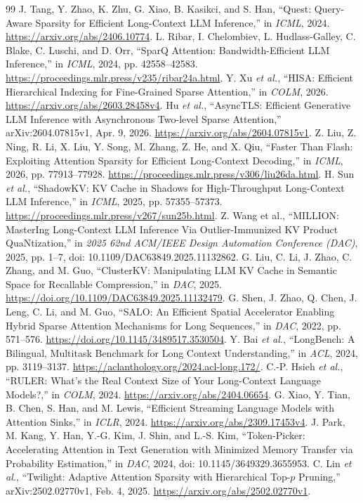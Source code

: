 \begin{thebibliography}{99}
 J. Tang, Y. Zhao, K. Zhu, G. Xiao, B. Kasikci, and S. Han, ``Quest: Query-Aware Sparsity for Efficient Long-Context LLM Inference,'' in \emph{ICML}, 2024. \url{https://arxiv.org/abs/2406.10774}.
 L. Ribar, I. Chelombiev, L. Hudlass-Galley, C. Blake, C. Luschi, and D. Orr, ``SparQ Attention: Bandwidth-Efficient LLM Inference,'' in \emph{ICML}, 2024, pp. 42558--42583. \url{https://proceedings.mlr.press/v235/ribar24a.html}.
 Y. Xu \emph{et al.}, ``HISA: Efficient Hierarchical Indexing for Fine-Grained Sparse Attention,'' in \emph{COLM}, 2026. \url{https://arxiv.org/abs/2603.28458v4}.
 Hu \emph{et al.}, ``AsyncTLS: Efficient Generative LLM Inference with Asynchronous Two-level Sparse Attention,'' arXiv:2604.07815v1, Apr. 9, 2026. \url{https://arxiv.org/abs/2604.07815v1}.
 Z. Liu, Z. Ning, R. Li, X. Liu, Y. Song, M. Zhang, Z. He, and X. Qiu, ``Faster Than Flash: Exploiting Attention Sparsity for Efficient Long-Context Decoding,'' in \emph{ICML}, 2026, pp. 77913--77928. \url{https://proceedings.mlr.press/v306/liu26da.html}.
 H. Sun \emph{et al.}, ``ShadowKV: KV Cache in Shadows for High-Throughput Long-Context LLM Inference,'' in \emph{ICML}, 2025, pp. 57355--57373. \url{https://proceedings.mlr.press/v267/sun25b.html}.
 Z. Wang et al., ``MILLION: MasterIng Long-Context LLM Inference Via Outlier-Immunized KV Product QuaNtization,'' in \emph{2025 62nd ACM/IEEE Design Automation Conference (DAC)}, 2025, pp. 1--7, doi: 10.1109/DAC63849.2025.11132862.
 G. Liu, C. Li, J. Zhao, C. Zhang, and M. Guo, ``ClusterKV: Manipulating LLM KV Cache in Semantic Space for Recallable Compression,'' in \emph{DAC}, 2025. \url{https://doi.org/10.1109/DAC63849.2025.11132479}.
 G. Shen, J. Zhao, Q. Chen, J. Leng, C. Li, and M. Guo, ``SALO: An Efficient Spatial Accelerator Enabling Hybrid Sparse Attention Mechanisms for Long Sequences,'' in \emph{DAC}, 2022, pp. 571--576. \url{https://doi.org/10.1145/3489517.3530504}.
 Y. Bai \emph{et al.}, ``LongBench: A Bilingual, Multitask Benchmark for Long Context Understanding,'' in \emph{ACL}, 2024, pp. 3119--3137. \url{https://aclanthology.org/2024.acl-long.172/}.
 C.-P. Hsieh \emph{et al.}, ``RULER: What's the Real Context Size of Your Long-Context Language Models?,'' in \emph{COLM}, 2024. \url{https://arxiv.org/abs/2404.06654}.
 G. Xiao, Y. Tian, B. Chen, S. Han, and M. Lewis, ``Efficient Streaming Language Models with Attention Sinks,'' in \emph{ICLR}, 2024. \url{https://arxiv.org/abs/2309.17453v4}.
 J. Park, M. Kang, Y. Han, Y.-G. Kim, J. Shin, and L.-S. Kim, ``Token-Picker: Accelerating Attention in Text Generation with Minimized Memory Transfer via Probability Estimation,'' in \emph{DAC}, 2024, doi: 10.1145/3649329.3655953.
 C. Lin \emph{et al.}, ``Twilight: Adaptive Attention Sparsity with Hierarchical Top-$p$ Pruning,'' arXiv:2502.02770v1, Feb. 4, 2025. \url{https://arxiv.org/abs/2502.02770v1}.
\end{thebibliography}
